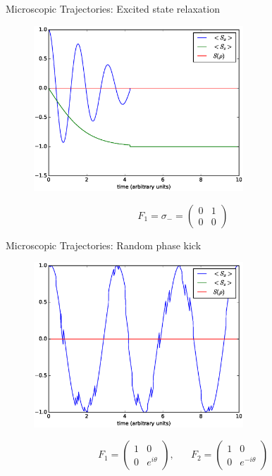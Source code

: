 \documentclass{beamer}
\begin{document}
\begin{frame}{Microscopic Trajectories: Excited state relaxation}
	
	\begin{figure}[!htb]
		\centering
		\includegraphics[width=0.7\textwidth]{figs/relaxation_1.eps}
	\end{figure}
		\begin{equation*}
		F_1 = \sigma_- =
		\begin{pmatrix}
		0 & 1 \\
		0 & 0 
		\end{pmatrix}
		\end{equation*}
\end{frame}


\begin{frame}{Microscopic Trajectories: Random phase kick}
	\begin{figure}[h]
		\centering
		\includegraphics[width=0.7\textwidth]{figs/phase_jump_1.eps}
	\end{figure}
	\begin{equation*}
	F_1 =
	\begin{pmatrix}
	1 & 0 \\
	0 & e^{i\theta} 
	\end{pmatrix},\hspace{20pt}
	F_2 = 
	\begin{pmatrix}
	1 & 0 \\
	0 & e^{-i\theta} 
	\end{pmatrix}
	\end{equation*}
\end{frame}
\end{document}
